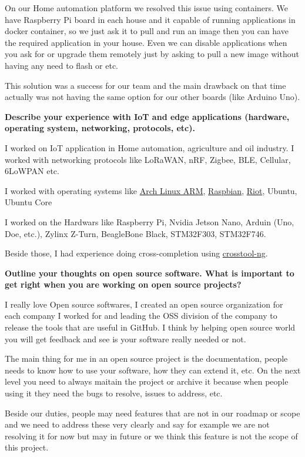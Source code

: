 On our Home automation platform we resolved this issue using containers. We have Raspberry Pi board in each house
and it capable of running applications in docker container, so we just ask it to pull and run an image then
you can have the required application in your house. Even we can disable applications when you ask for or upgrade
them remotely just by asking to pull a new image without having any need to flash or etc.

This solution was a success for our team and the main drawback on that time actually was not having the same
option for our other boards (like Arduino Uno).

\noindent
\textbf{Describe your experience with IoT and edge applications (hardware, operating system, networking, protocols, etc).}

I worked on IoT application in Home automation, agriculture and oil industry. I worked with networking protocols
like LoRaWAN, nRF, Zigbee, BLE, Cellular, 6LoWPAN etc.

I worked with operating systems like \href{https://archlinuxarm.org/}{Arch Linux ARM}, \href{https://www.raspbian.org/}{Raspbian},
\href{https://www.riot-os.org/}{Riot}, Ubuntu, Ubuntu Core

I worked on the Hardwars like Raspberry Pi, Nvidia Jetson Nano, Arduin (Uno, Doe, etc.), Zylinx Z-Turn, BeagleBone Black,
STM32F303, STM32F746.

Beside those, I had experience doing cross-completion using \href{https://github.com/crosstool-ng/crosstool-ng}{crosstool-ng}.

\noindent
\textbf{Outline your thoughts on open source software. What is important to get right when you are working on open source projects?}

I really love Open source softwares, I created an open source organization for each company I worked for and leading
the OSS division of the company to release the tools that are useful in GitHub. I think by helping open source world
you will get feedback and see is your software really needed or not.

The main thing for me in an open source project is the documentation, people needs to know how to use your software,
how they can extend it, etc. On the next level you need to always maitain the project or archive it because
when people using it they need the bugs to resolve, issues to address, etc.

Beside our duties, people may need features that are not in our roadmap or scope and we need to address these very
clearly and say for example we are not resolving it for now but may in future or we think this feature is not the
scope of this project.

